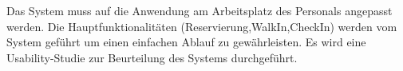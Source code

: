 \documentclass[../../Pflichtenheft.tex]{subfiles}
\begin{document}
    Das System muss auf die Anwendung am Arbeitsplatz des Personals angepasst werden.
    Die Hauptfunktionalitäten (Reservierung,WalkIn,CheckIn) werden vom System geführt um einen einfachen Ablauf zu gewährleisten.
    Es wird eine Usability-Studie zur Beurteilung des Systems durchgeführt.
\end{document}

